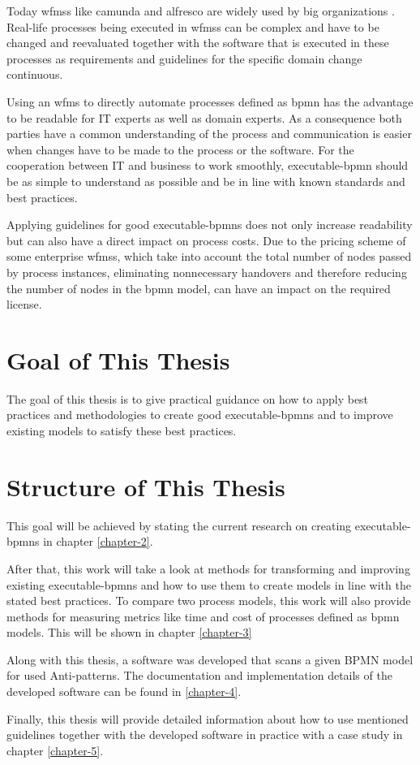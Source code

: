 Today \gls{wfms}s like \gls{camunda}  and \gls{alfresco} are widely used by big organizations \cite{camunda-customers} \cite{activity-customers}. Real-life processes being executed in \gls{wfms}s can be complex and have to be changed and reevaluated together with the software that is executed in these processes as requirements and guidelines for the specific domain change continuous. 

Using an \gls{wfms} to directly automate processes defined as \gls{bpmn} has the advantage to be readable for IT experts as well as domain experts. As a consequence both parties have a common understanding of the process and communication is easier when changes have to be made to the process or the software. For the cooperation between IT and business to work smoothly, \gls{executable-bpmn} should be as simple to understand as possible and be in line with known standards and best practices. 

Applying guidelines for good \gls{executable-bpmn}s does not only increase readability but can also have a direct impact on process costs. Due to the pricing scheme of some enterprise \gls{wfms}s, which take into account the total number of nodes passed by process instances, eliminating nonnecessary handovers and therefore reducing the number of nodes in the \gls{bpmn} model, can have an impact on the required license. 

\section{Goal of This Thesis}
The goal of this thesis is to give practical guidance on how to apply best practices and methodologies to create good \gls{executable-bpmn}s and to improve existing models to satisfy these best practices. 


\section{Structure of This Thesis}
This goal will be achieved by stating the current research on creating \gls{executable-bpmn}s in chapter \ref{chapter-2}. 

After that, this work will take a look at methods for transforming and improving existing \gls{executable-bpmn}s and how to use them to create models in line with the stated best practices. To compare two process models, this work will also provide methods for measuring metrics like time and cost of processes defined as \gls{bpmn} models. This will be shown in chapter \ref{chapter-3}

Along with this thesis, a software was developed that scans a given BPMN model for used Anti-patterns. The documentation and implementation details of the developed software can be found in \ref{chapter-4}.  

Finally, this thesis will provide detailed information about how to use mentioned guidelines together with the developed software in practice with a case study in chapter \ref{chapter-5}.